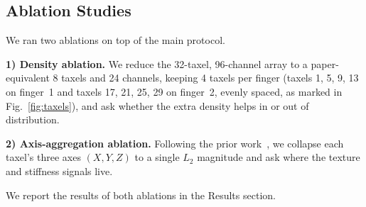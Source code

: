 \documentclass[journal]{IEEEtran}
\begin{document}
\subsection{Ablation Studies}
\label{Experiments:Ablation_Studies}

We ran two ablations on top of the main protocol.

\textbf{1) Density ablation.} We reduce the 32-taxel, 96-channel array to a paper-equivalent 8 taxels and 24 channels, keeping 4 taxels per finger (taxels 1, 5, 9, 13 on finger~1 and taxels 17, 21, 25, 29 on finger~2, evenly spaced, as marked in Fig.~\ref{fig:taxels}), and ask whether the extra density helps in or out of distribution.

\textbf{2) Axis-aggregation ablation.} Following the prior work~\cite{cmd_source}, we collapse each taxel's three axes $(X, Y, Z)$ to a single $L_2$ magnitude and ask where the texture and stiffness signals live.

We report the results of both ablations in the Results section.
%





\end{document}
